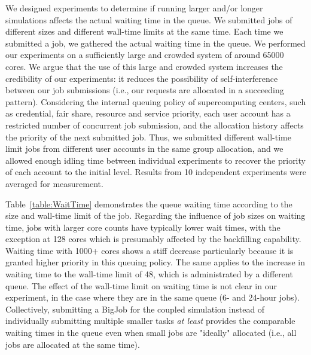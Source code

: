 \documentclass[preprint,12pt]{elsarticle}
\begin{document}
We designed experiments to determine if running larger and/or longer simulations affects the actual waiting time in the queue. We submitted jobs of different sizes and different wall-time limits at the same time. Each time we submitted a job, we gathered the actual waiting time in the queue. We performed our experiments on a sufficiently large and crowded system of around 65000 cores. We argue that the use of this large and crowded system increases the credibility of our experiments: it reduces the possibility of self-interference between our job submissions (i.e., our requests are allocated in a succeeding pattern). Considering the internal queuing policy of supercomputing centers, such as credential, fair share, resource and service priority, each user account has a restricted number of concurrent job submission, and the allocation history affects the priority of the next submitted job. Thus, we submitted different wall-time limit jobs from different user accounts in the same group allocation, and we allowed enough idling time between individual experiments to recover the priority of each account to the initial level. Results from 10 independent experiments were averaged for measurement.

Table~\ref{table:WaitTime} demonstrates the queue waiting time according to the size and wall-time limit of the job. Regarding the influence of job sizes on waiting time, jobs with larger core counts have typically lower wait times, with the exception at 128 cores which is presumably affected by the backfilling capability. Waiting time with 1000+ cores shows a stiff decrease particularly because it is granted higher priority in this queuing policy. The same applies to the increase in waiting time to the wall-time limit of 48, which is administrated by a different queue. The effect of the wall-time limit on waiting time is not clear in our experiment, in the case where they are in the same queue (6- and 24-hour jobs). Collectively, submitting a BigJob for the coupled simulation instead of individually submitting multiple smaller tasks \textit{at least} provides the comparable waiting times in the queue even when small jobs are "ideally" allocated (i.e., all jobs are allocated at the same time).
\end{document}
